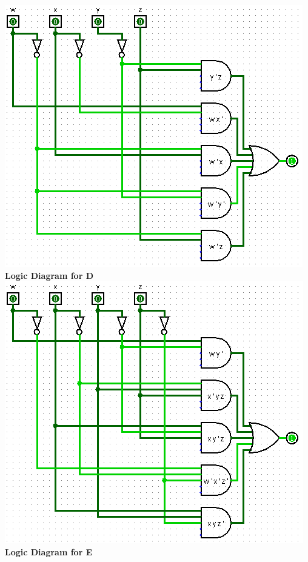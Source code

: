 \documentclass{article}
\begin{document}
\begin{enumerate}[label=\arabic*]
    \includegraphics[scale=.72]{C.PNG} \\
    \newpage
    \textbf{Logic Diagram for D} \\
    \includegraphics[scale=.72]{D.PNG} \\
    \hfill
    \textbf{Logic Diagram for E} \\

\end{enumerate}
\end{document}
